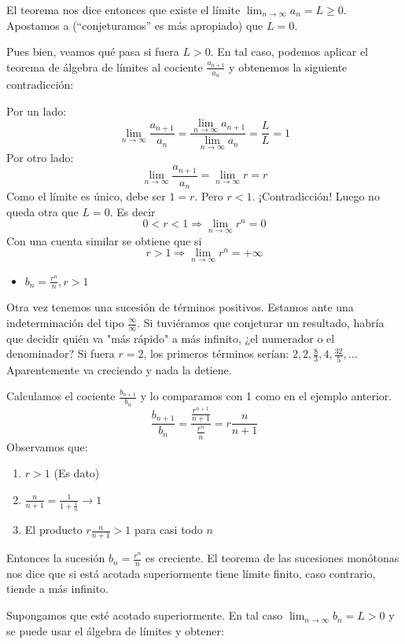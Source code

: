 \documentclass[../teoria.root.tex]{subfiles}
\begin{document}
El teorema nos dice entonces que existe el límite \(\lim_{n\to\infty}a_n=L\geq0\).
Apostamos a (“conjeturamos” es más apropiado) que \(L=0\).

Pues bien, veamos qué pasa si fuera \(L>0\).
En tal caso, podemos aplicar el teorema de álgebra de límites al cociente \(\frac{a_{n+1}}{a_n}\) y obtenemos la siguiente contradicción:

Por un lado:
\[\lim_{n\to\infty}\frac{a_{n+1}}{a_n}=\frac{\lim_{n\to\infty}a_{n+1}}{\lim_{n\to\infty}a_n}=\frac{L}{L}=1\]
Por otro lado:
\[\lim_{n\to\infty}\frac{a_{n+1}}{a_n}=\lim_{n\to\infty}r=r\]
Como el límite es único, debe ser \(1=r\).
Pero \(r<1\).
¡Contradicción!
Luego no queda otra que \(L=0\).
Es decir
\[0<r<1\Rightarrow\lim_{n\to\infty}r^n=0\]
Con una cuenta similar se obtiene que si
\[r>1\Rightarrow\lim_{n\to\infty}r^n=+\infty\]
\begin{itemize}
	\item \(b_n=\frac{r^n}{n}, r>1\)
\end{itemize}
Otra vez tenemos una sucesión de términos positivos.
Estamos ante una indeterminación del tipo \(\frac{\infty}{\infty}\).
Si tuviéramos que conjeturar un resultado, habría que decidir quién va "más rápido" a más infinito, ¿el numerador o el denominador?
Si fuera \(r=2\), los primeros términos serían:
\(2,2,\frac{8}{3},4,\frac{32}{5},\dots\)
Aparentemente va creciendo y nada la detiene.

Calculamos el cociente \(\frac{b_{n+1}}{b_n}\) y lo comparamos con 1 como en el ejemplo anterior.
\[\frac{b_{n+1}}{b_n}=\frac{\frac{r^{n+1}}{n+1}}{\frac{r^n}{n}}=r\frac{n}{n+1}\]
Observamos que:
\begin{enumerate}
	\item \(r>1\) (Es dato)
	\item \(\frac{n}{n+1}=\frac{1}{1+\frac{1}{n}}\rightarrow1\)
	\item El producto \(r\frac{n}{n+1}>1\) para casi todo \(n\)
\end{enumerate}
Entonces la sucesión \(b_n=\frac{r^n}{n}\) es creciente.
El teorema de las sucesiones monótonas nos dice que si está acotada superiormente tiene límite finito, caso contrario, tiende a más infinito.

Supongamos que esté acotado superiormente.
En tal caso \(\lim_{n\to\infty}b_n=L>0\) y se puede usar el álgebra de límites y obtener:
\end{document}
